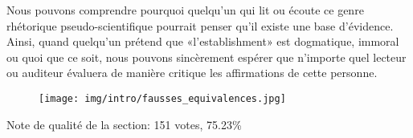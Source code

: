 	Nous pouvons comprendre pourquoi quelqu'un qui lit ou écoute ce genre rhétorique pseudo-scientifique pourrait penser qu'il existe une base d'évidence. Ainsi, quand quelqu'un prétend que «l'establishment» est dogmatique, immoral ou quoi que ce soit, nous pouvons sincèrement espérer que n'importe quel lecteur ou auditeur évaluera de manière critique les affirmations de cette personne.
	
	\begin{figure}[H]
		\centering
		\texttt{[image: img/intro/fausses\_equivalences.jpg]}
	\end{figure}
	
	\begin{flushright}
	Note de qualit\'e de la section:  151 votes, 75.23\%
	\end{flushright}